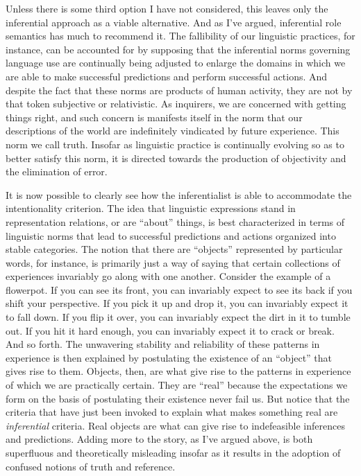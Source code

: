 Unless there is some third option I have not considered, this leaves only the inferential approach as a viable alternative. And as I've argued, inferential role semantics has much to recommend it. The fallibility of our linguistic practices, for instance, can be accounted for by supposing that the inferential norms governing language use are continually being adjusted to enlarge the domains in which we are able to make successful predictions and perform successful actions. And despite the fact that these norms are products of human activity, they are not by that token subjective or relativistic. As inquirers, we are concerned with getting things right, and such concern is manifests itself in the norm that our descriptions of the world are indefinitely vindicated by future experience. This norm we call truth. Insofar as linguistic practice is continually evolving so as to better satisfy this norm, it is directed towards the production of objectivity and the elimination of error.

It is now possible to clearly see how the inferentialist is able to accommodate the intentionality criterion. The idea that linguistic expressions stand in representation relations, or are ``about'' things, is best characterized in terms of linguistic norms that lead to successful predictions and actions organized into stable categories. The notion that there are ``objects'' represented by particular words, for instance, is primarily just a way of saying that certain collections of experiences invariably go along with one another. Consider the example of a flowerpot. If you can see its front, you can invariably expect to see its back if you shift your perspective. If you pick it up and drop it, you can invariably expect it to fall down. If you flip it over, you can invariably expect the dirt in it to tumble out. If you hit it hard enough, you can invariably expect it to crack or break. And so forth. The unwavering stability and reliability of these patterns in experience is then explained by postulating the existence of an ``object'' that gives rise to them. Objects, then, are what give rise to the patterns in experience of which we are practically certain. They are ``real'' because the expectations we form on the basis of postulating their existence never fail us. But notice that the criteria that have just been invoked to explain what makes something real are \textit{inferential} criteria. Real objects are what can give rise to indefeasible inferences and predictions. Adding more to the story, as I've argued above, is both superfluous and theoretically misleading insofar as it results in the adoption of confused notions of truth and reference. 

